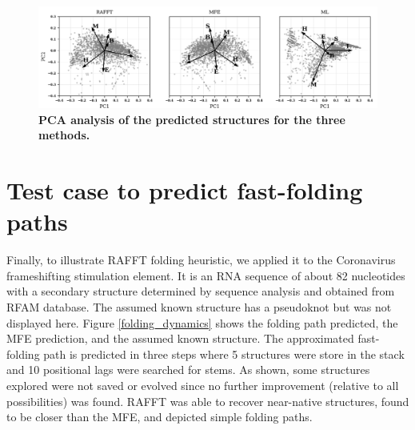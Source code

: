 \documentclass[a4paper,12pt]{article}
\begin{document}
{{\begin{figure}[htbp]
\centering
\includegraphics[width=.9\linewidth]{img/pca_predicted.png}
\caption{\label{pred_struct_space}\textbf{PCA analysis of the predicted structures for the three methods.}}
\end{figure}

\clearpage
\section{Test case to predict fast-folding paths}
\label{sec:org5792606}
Finally, to illustrate RAFFT folding heuristic, we applied it to the Coronavirus
frameshifting stimulation element. It is an RNA sequence of about 82 nucleotides
with a secondary structure determined by sequence analysis and obtained from
RFAM database. The assumed known structure has a pseudoknot but was not
displayed here. Figure \ref{folding_dynamics} shows the folding path predicted,
the MFE prediction, and the assumed known structure. The approximated
fast-folding path is predicted in three steps where 5 structures were store in
the stack and 10 positional lags were searched for stems. As shown, some
structures explored were not saved or evolved since no further improvement
(relative to all possibilities) was found. RAFFT was able to recover near-native
structures, found to be closer than the MFE, and depicted simple folding paths.

\begin{figure}
\end{figure}}}
\end{document}
